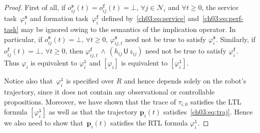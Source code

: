 \begin{proof}
First of all, if $o^\texttt{s}_{ij}(t)=o^\texttt{f}_{ij}(t)=\bot$, $\forall j\in \mathcal{N}_i$ and $\forall t\geq 0$, the service task~$\varphi_{i}^\texttt{s}$ and formation task~$\varphi_{i}^\texttt{f}$ defined by~\eqref{ch03:eq:service} and~\eqref{ch03:eq:perf-task} may be ignored owing to the semantics of the implication operator. In particular, if $o^\texttt{s}_{ij}(t)=\bot$, $\forall t\geq 0$,  $\varphi_{ij,t}^{\texttt{s}}$ need not be true to satisfy $\varphi_{i}^\texttt{s}$. Similarly, if $o^\texttt{f}_{ij}(t)=\bot$, $\forall t\geq 0$,  then $\varphi_{ij,t}^{\texttt{f}}\,\wedge\,(h_{ij}\,\mathsf{U}\,z_{ij})$ need not be true to satisfy $\varphi_{i}^\texttt{f}$.
Thus $\varphi_i$ is equivalent to $\varphi_i^\texttt{l}$ and $[\varphi_i]$ is equivalent to $[\varphi_i^\texttt{l}]$.

Notice also that~$\varphi_i^\texttt{l}$ is specified over $R$ and hence depends solely on the robot's trajectory, since it does not contain any observational or controllable propositions.
Moreover, we have shown that the trace of $\tau_{i,0}$ satisfies the LTL formula $[\varphi_i^\texttt{l}]$ as well as that the trajectory $\mathbf{p}_i(t)$  satisfies~\eqref{ch03:eq:traj}.
Hence we also need to show that~$\mathbf{p}_i(t)$ satisfies the RTL formula $\varphi_i^{\texttt{l}}$.


\end{proof}
